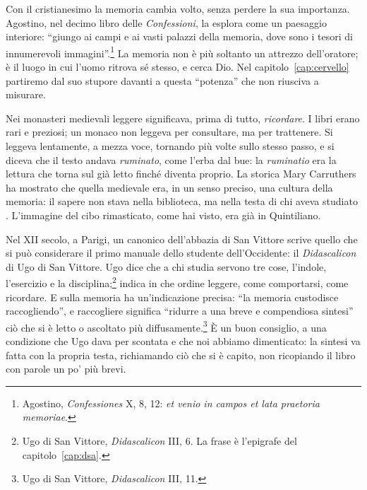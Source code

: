 Con il cristianesimo la memoria cambia volto, senza perdere la sua
importanza. Agostino, nel decimo libro delle \emph{Confessioni}, la
esplora come un paesaggio interiore: \enquote{giungo ai campi e ai
vasti palazzi della memoria, dove sono i tesori di innumerevoli
immagini}.\footnote{Agostino, \emph{Confessiones} X, 8, 12:
\emph{et venio in campos et lata praetoria memoriae}.} La memoria non è
più soltanto un attrezzo dell'oratore; è il luogo in cui l'uomo ritrova
sé stesso, e cerca Dio. Nel capitolo~\ref{cap:cervello} partiremo dal
suo stupore davanti a questa \enquote{potenza} che non riusciva a
misurare.

Nei monasteri medievali leggere significava, prima di tutto,
\emph{ricordare}. I libri erano rari e preziosi; un monaco non leggeva
per consultare, ma per trattenere. Si leggeva lentamente, a mezza voce,
tornando più volte sullo stesso passo, e si diceva che il testo andava
\emph{ruminato}, come l'erba dal bue: la \emph{ruminatio} era la
lettura che torna sul già letto finché diventa proprio. La storica Mary
Carruthers ha mostrato che quella medievale era, in un senso preciso,
una cultura della memoria: il sapere non stava nella biblioteca, ma
nella testa di chi aveva studiato \parencite{carruthers1990}.
L'immagine del cibo rimasticato, come hai visto, era già in Quintiliano.

Nel XII secolo, a Parigi, un canonico dell'abbazia di San Vittore scrive
quello che si può considerare il primo manuale dello studente
dell'Occidente: il \emph{Didascalicon} di Ugo di San Vittore. Ugo dice
che a chi studia servono tre cose, l'indole, l'esercizio e la
disciplina;\footnote{Ugo di San Vittore, \emph{Didascalicon} III, 6.
La frase è l'epigrafe del capitolo~\ref{cap:dsa}.} indica in che ordine
leggere, come comportarsi, come ricordare. E sulla memoria ha
un'indicazione precisa: \enquote{la memoria custodisce raccogliendo}, e
raccogliere significa \enquote{ridurre a una breve e compendiosa
sintesi} ciò che si è letto o ascoltato più
diffusamente.\footnote{Ugo di San Vittore, \emph{Didascalicon} III,
11.} È un buon consiglio, a una condizione che Ugo dava per scontata e
che noi abbiamo dimenticato: la sintesi va fatta con la propria testa,
richiamando ciò che si è capito, non ricopiando il libro con parole un
po' più brevi.

